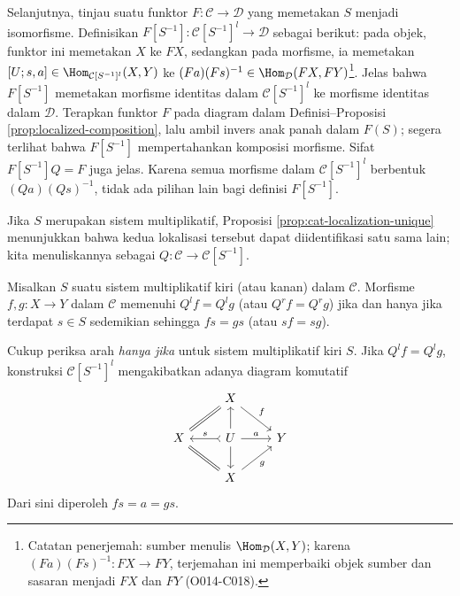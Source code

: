 \begin{bukti}
	Selanjutnya, tinjau suatu funktor $F:\mathcal{C}\to\mathcal{D}$ yang
	memetakan $S$ menjadi isomorfisme. Definisikan
	$F[S^{-1}]:\mathcal{C}[S^{-1}]^l\to\mathcal{D}$ sebagai berikut: pada
	objek, funktor ini memetakan $X$ ke $FX$, sedangkan pada morfisme, ia
	memetakan
	$[U;s,a]\in\Hom_{\mathcal{C}[S^{-1}]^l}(X,Y)$ ke
	$(Fa)(Fs)^{-1}\in\Hom_{\mathcal{D}}(FX,FY)$\footnote{Catatan penerjemah:
	sumber menulis $\Hom_{\mathcal{D}}(X,Y)$; karena
	$(Fa)(Fs)^{-1}:FX\to FY$, terjemahan ini memperbaiki objek sumber dan
	sasaran menjadi $FX$ dan $FY$ (O014-C018).}. Jelas bahwa $F[S^{-1}]$
	memetakan morfisme identitas dalam $\mathcal{C}[S^{-1}]^l$ ke morfisme
	identitas dalam $\mathcal{D}$. Terapkan funktor $F$ pada diagram dalam
	Definisi--Proposisi \ref{prop:localized-composition}, lalu ambil invers
	anak panah dalam $F(S)$; segera terlihat bahwa $F[S^{-1}]$ mempertahankan
	komposisi morfisme. Sifat $F[S^{-1}]Q=F$ juga jelas. Karena semua morfisme
	dalam $\mathcal{C}[S^{-1}]^l$ berbentuk $(Qa)(Qs)^{-1}$, tidak ada
	pilihan lain bagi definisi $F[S^{-1}]$.
\end{bukti}

\begin{konvensi}
	Jika $S$ merupakan sistem multiplikatif, Proposisi
	\ref{prop:cat-localization-unique} menunjukkan bahwa kedua lokalisasi
	tersebut dapat diidentifikasi satu sama lain; kita menuliskannya sebagai
	$Q:\mathcal{C}\to\mathcal{C}[S^{-1}]$.
\end{konvensi}

\begin{korolari}\label{prop:fraction-zero}
	Misalkan $S$ suatu sistem multiplikatif kiri (atau kanan) dalam
	$\mathcal{C}$. Morfisme $f,g:X\to Y$ dalam $\mathcal{C}$ memenuhi
	$Q^l f=Q^l g$ (atau $Q^r f=Q^r g$) jika dan hanya jika terdapat
	$s\in S$ sedemikian sehingga $fs=gs$ (atau $sf=sg$).
\end{korolari}
\begin{bukti}
	Cukup periksa arah \emph{hanya jika} untuk sistem multiplikatif kiri $S$.
	Jika $Q^l f=Q^l g$, konstruksi $\mathcal{C}[S^{-1}]^l$ mengakibatkan
	adanya diagram komutatif
	\[\begin{tikzcd}
		& X \arrow[equal, ld] \arrow[rd, "f"] & \\
		X & U \arrow[rightarrowtail, l, "s"'] \arrow[r, "a"] \arrow[d] \arrow[u] & Y \\
		& X \arrow[equal, lu] \arrow[ru, "g"'] &
	\end{tikzcd}\]
	Dari sini diperoleh $fs=a=gs$.
\end{bukti}

